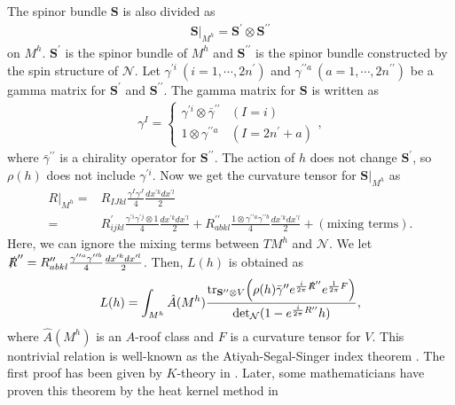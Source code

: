 \documentclass[11pt]{article}
\begin{document}
The spinor bundle $\mathbf{S}$ is also divided as
\begin{align}
    \mathbf{S}|_{M^h}= \mathbf{S}^{\prime}  \otimes \mathbf{S}^{\prime \prime}
\end{align}
on $M^h$. $\mathbf{S}^{\prime }$ is the spinor bundle of $M^h$ and $\mathbf{S}^{\prime \prime}$ is the spinor bundle constructed by the spin structure of $\mathcal{N}$. Let $\gamma^{\prime i}~(i=1,\cdots,2n^\prime)$ and $\gamma^{\prime\prime a}~(a=1,\cdots,2n^{\prime\prime})$ be a gamma matrix for $\mathbf{S}^\prime$ and $\mathbf{S}^{\prime\prime}$. The gamma matrix for $\mathbf{S}$ is written as
\begin{align}
    \gamma^I= \left\{ \begin{array}{ll}
        \gamma^{\prime i} \otimes \bar{\gamma}^{\prime\prime} & (I=i) \\
        1 \otimes \gamma^{\prime \prime a} & (I=2n^\prime +a)
    \end{array}, \right.
\end{align}
where $\bar{\gamma}^{\prime \prime}$ is a chirality operator for $\mathbf{S}^{\prime\prime}$. The action of $h$ does not change $\mathbf{S}^\prime$, so $\rho(h)$ does not include $\gamma^{\prime i}$. Now we get the curvature tensor for $\mathbf{S}|_{M^h}$ as
\begin{align}
R|_{M^h}= &R_{IJ kl} \frac{ \gamma^I \gamma^J }{4} \frac{dx^{\prime k} dx^{\prime l}}{2} \nonumber \\
=&  R_{ij kl }^\prime \frac{ \gamma^{\prime i} \gamma^{\prime j} \otimes 1  }{4}\frac{dx^{\prime k} dx^{\prime l} }{2} +   R_{ab kl}^{\prime\prime} \frac{ 1 \otimes \gamma^{\prime \prime a} \gamma^{\prime \prime b } }{4} \frac{dx^{\prime k} dx^{\prime l} }{2} +( \text{mixing terms}) . 
\end{align}
Here, we can ignore the mixing terms between $TM^h $ and $\mathcal{N}$.
We let $\slashed{R}^{\prime \prime}=R_{ab kl}^{\prime\prime} \frac{ \gamma^{\prime \prime a} \gamma^{\prime \prime b } }{4} \frac{dx^{\prime k} dx^{\prime l} }{2}$. Then, $L(h)$ is obtained as
\begin{align}
    L(h)= \int_{M^h} \hat{A} (M^h) \frac{ \text{tr}_{\mathbf{S}^{\prime \prime} \otimes V} \qty( \rho(h) \bar{\gamma}^{\prime\prime} e^{\frac{i}{2\pi} \slashed{R}^{\prime\prime} }  e^{\frac{1}{2\pi} F}) }{  \det_\mathcal{N}( 1- e^{\frac{i}{2\pi} R^{\prime\prime}} h)} \label{eq:AtiyahSegalSinger},
\end{align}
where $\hat{A} (M^h)$ is an $A$-roof class and $F$ is a curvature tensor for $V$. This nontrivial relation is well-known as the Atiyah-Segal-Singer index theorem \cite{Atiyah1968TheIndex, berline1985computation,bismut1985infinitesimal,bismut1986localization}. The first proof has been given by $K$-theory in \cite{Atiyah1968TheIndex}. Later, some mathematicians have proven this theorem by the heat kernel method in \cite{berline1985computation,bismut1985infinitesimal,bismut1986localization}
\end{document}
